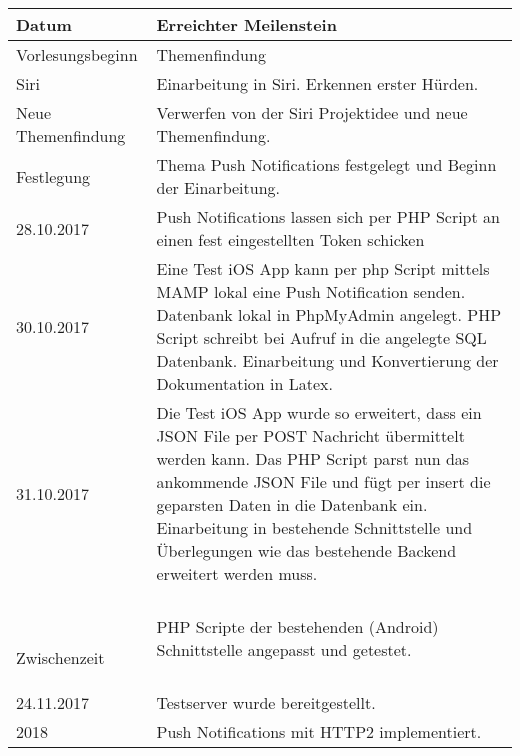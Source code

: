 \noindent%
\begin{tabularx}{\textwidth}{|p{}|X| }
\hline
\textbf{Datum} & \textbf{Erreichter Meilenstein}  \\ \hline 

Vorlesungsbeginn & Themenfindung \\ \hline

Siri & Einarbeitung in Siri. Erkennen erster Hürden. \\ \hline

Neue Themenfindung & Verwerfen von der Siri Projektidee und neue Themenfindung. \\ \hline

Festlegung & Thema Push Notifications festgelegt und Beginn der Einarbeitung. \\ \hline

28.10.2017 & Push Notifications lassen sich per PHP Script an einen fest eingestellten Token schicken \\ \hline

30.10.2017 & Eine Test iOS App kann per php Script mittels MAMP lokal eine Push Notification senden. \newline
Datenbank lokal in PhpMyAdmin angelegt. \newline
PHP Script schreibt bei Aufruf in die angelegte SQL Datenbank. \newline
Einarbeitung und Konvertierung der Dokumentation in Latex.
 \\ \hline
 31.10.2017 & Die Test iOS App wurde so erweitert, dass ein JSON File per POST Nachricht übermittelt werden kann.\newline
Das PHP Script parst nun das ankommende JSON File und fügt per insert die geparsten Daten in die Datenbank ein.\newline 
Einarbeitung in bestehende Schnittstelle und Überlegungen wie das bestehende Backend erweitert werden muss. 
 \\ \hline
 
 \
 

Zwischenzeit & PHP Scripte der bestehenden (Android) Schnittstelle angepasst und getestet. \newline
\\ \hline 
 
 
24.11.2017 & Testserver wurde bereitgestellt. \newline
\\ \hline 
 
 
2018 & Push Notifications mit HTTP2 implementiert.
\newline
\\ \hline  

\end{tabularx}


